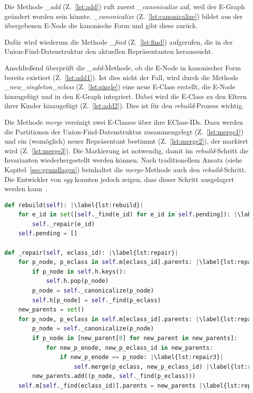 Die Methode \textit{\_add} (Z.~\ref{lst:add}) ruft zuerst \textit{\_canonicalize} auf, weil der E-Graph geändert worden sein könnte.
\textit{\_canonicalize} (Z.~\ref{lst:canonicalize}) bildet aus der übergebenen E-Node die kanonische Form und gibt diese zurück.
\newpage

Dafür wird wiederum die Methode \textit{\_find} (Z.~\ref{lst:find}) aufgerufen, die in der Union-Find-Datenstruktur den aktuellen Repräsentanten heraussucht.

Anschließend überprüft die \textit{\_add}-Methode, ob die E-Node in kanonischer Form bereits existiert (Z.~\ref{lst:add1}). Ist dies nicht der Fall, wird durch 
die Methode \textit{\_new\_singleton\_eclass} (Z.~\ref{lst:single}) eine neue E-Class erstellt, die E-Node hinzugefügt und in den E-Graph integriert. Dabei wird die E-Class zu den Eltern
ihrer Kinder hinzugefügt (Z.~\ref{lst:add2}). Dies ist für den \textit{rebuild}-Prozess wichtig.

Die Methode \textit{merge} vereinigt zwei E-Classes über ihre EClass-IDs. Dazu werden die Partitionen der Union-Find-Datenstruktur zusammengelegt (Z.~\ref{lst:merge1}) und ein (womöglich)
neuer Repräsentant bestimmt (Z.~\ref{lst:merge2}), der markiert wird (Z.~\ref{lst:merge3}). Die Markierung ist notwendig, damit im \textit{rebuild}-Schritt die Invarianten wiederhergestellt werden können.
Nach traditionellem Ansatz (siehe Kapitel~\ref{sec:grundlagen}) beinhaltet die \textit{merge}-Methode auch den \textit{rebuild}-Schritt. Die Entwickler von \textit{egg} konnten jedoch
zeigen, dass dieser Schritt ausgelagert werden kann~\cite{2021-egg}.

\begin{lstlisting}[language=Python, escapechar=|, caption=\textit{rebuild}- und \textit{repair}-Methode, label={lst:methods2}]
def rebuild(self): |\label{lst:rebuild}|
    for e_id in set([self._find(e_id) for e_id in self.pending]): |\label{lst:rebuild1}|
        self._repair(e_id)
    self.pending = []

def _repair(self, eclass_id): |\label{lst:repair}|
    for p_node, p_eclass in self.m[eclass_id].parents: |\label{lst:repair1}|
        if p_node in self.h.keys():
            self.h.pop(p_node)
        p_node = self._canonicalize(p_node)
        self.h[p_node] = self._find(p_eclass)
    new_parents = set()
    for p_node, p_eclass in self.m[eclass_id].parents: |\label{lst:repair2}|
        p_node = self._canonicalize(p_node)
        if p_node in [new_parent[0] for new_parent in new_parents]:
            for new_p_enode, new_p_eclass_id in new_parents:
                if new_p_enode == p_node: |\label{lst:repair3}|
                    self.merge(p_eclass, new_p_eclass_id) |\label{lst:repair4}|
        new_parents.add((p_node, self._find(p_eclass)))
    self.m[self._find(eclass_id)].parents = new_parents |\label{lst:repair99}|
\end{lstlisting} 

